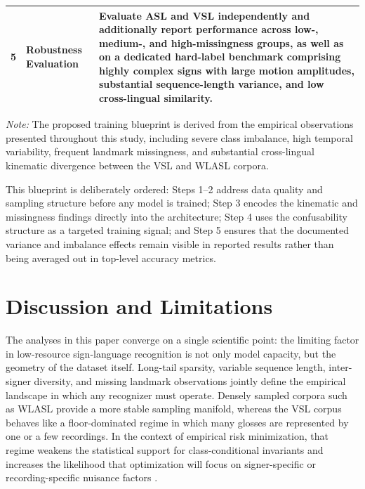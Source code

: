 \documentclass{ieeeaccess}
\begin{document}
\begin{table}[!t]
\begin{tabular}{p{0.7cm}p{3.2cm}p{11.8cm}}
\addlinespace

5 &
Robustness Evaluation &
Evaluate ASL and VSL independently and additionally report performance across low-, medium-, and high-missingness groups, as well as on a dedicated hard-label benchmark comprising highly complex signs with large motion amplitudes, substantial sequence-length variance, and low cross-lingual similarity. \\

\bottomrule

\end{tabular}

\vspace{2mm}

\footnotesize
\textit{Note:}
The proposed training blueprint is derived from the empirical observations presented throughout this study, including severe class imbalance, high temporal variability, frequent landmark missingness, and substantial cross-lingual kinematic divergence between the VSL and WLASL corpora.

\end{table}

This blueprint is deliberately ordered: Steps 1--2 address data quality and sampling structure before any model is trained; Step 3 encodes the kinematic and missingness findings directly into the architecture; Step 4 uses the confusability structure as a targeted training signal; and Step 5 ensures that the documented variance and imbalance effects remain visible in reported results rather than being averaged out in top-level accuracy metrics.

\section{Discussion and Limitations} \label{sec:discussion}

The analyses in this paper converge on a single scientific point: the limiting factor in low-resource sign-language recognition is not only model capacity, but the geometry of the dataset itself. Long-tail sparsity, variable sequence length, inter-signer diversity, and missing landmark observations jointly define the empirical landscape in which any recognizer must operate. Densely sampled corpora such as WLASL provide a more stable sampling manifold, whereas the VSL corpus behaves like a floor-dominated regime in which many glosses are represented by one or a few recordings. In the context of empirical risk minimization, that regime weakens the statistical support for class-conditional invariants and increases the likelihood that optimization will focus on signer-specific or recording-specific nuisance factors \cite{buda2018systematic}.
\end{document}
